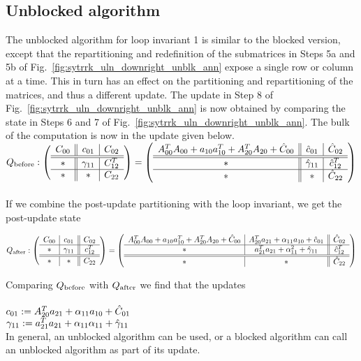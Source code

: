 \subsection{Unblocked algorithm}
The unblocked algorithm for loop invariant 1 is similar to the blocked version, except that the repartitioning and
redefinition of the submatrices in Steps 5a and 5b of Fig.~\ref{fig:sytrrk_uln_downright_unblk_ann}
expose a single row or column at a time. This in turn has an effect on the partitioning and
repartitioning of the matrices, and thus a different update. The update in Step 8 of
Fig.~\ref{fig:sytrrk_uln_downright_unblk_ann} is now obtained by comparing the state in
Steps 6 and 7 of Fig.~\ref{fig:sytrrk_uln_downright_unblk_ann}. The bulk of the computation is now in the update
given below.
\\
{
$  \\
Q_{\rm before}:
\left( \begin{array}{c || c | c}  C_{00}  &  c_{01}  &  C_{02}  \\ \hline \hline  *  &  \gamma_{11} &  C_{12}^T  \\ \hline  *  &  *  &  C_{22}  \end{array} \right)
=
\left( \begin{array}{c || c | c}  A_{00}^T A_{00} + a_{10} a_{10}^T + A_{20}^T A_{20} + \hat{C}_{00}  &  \hat{c}_{01}  &  \hat{C}_{02}  \\ \hline \hline  *  &  \hat{\gamma}_{11}  &  \hat{c}_{12}^T  \\ \hline  *  &  *  &  \hat{C}_{22}  \end{array} \right)
$
}
\\
\\
If we combine the post-update partitioning with the loop invariant, we get the post-update state %


$  \\
Q_{\rm after}:
\left( \begin{array}{c | c || c}  C_{00}  &  c_{01}  &  C_{02}  \\ \hline  *  &  \gamma_{11}  &  c_{12}^T  \\ \hline \hline  *  &  *  &  C_{22}  \end{array} \right)
=
\left( \begin{array}{c | c || c}   A_{00}^T A_{00} + a_{10} a_{10}^T + A_{20}^T A_{20} + \hat{C}_{00}  &  A_{20}^T a_{21} + \alpha_{11} a_{10} + \hat{c}_{01}  &  \hat{C}_{02}  \\ \hline  *  &  a_{21}^T a_{21} + \alpha_{11}^2 + \hat{\gamma}_{11}  &  \hat{c}_{12}^T  \\ \hline \hline  *  &  *  &  \hat{C}_{22}  \end{array} \right)
$

Comparing $Q_{\rm before}$ with $Q_{\rm after}$ we find that the updates
\\
\\
$c_{01} := A_{20}^T a_{21} + \alpha_{11} a_{10} + \hat{C}_{01}$ \\
$ \gamma_{11} := a_{21}^T a_{21} + \alpha_{11} \alpha_{11} + \hat{\gamma}_{11} $
\\

In general, an unblocked algorithm can be used, or a blocked algorithm can call an unblocked algorithm as part
of its update.

